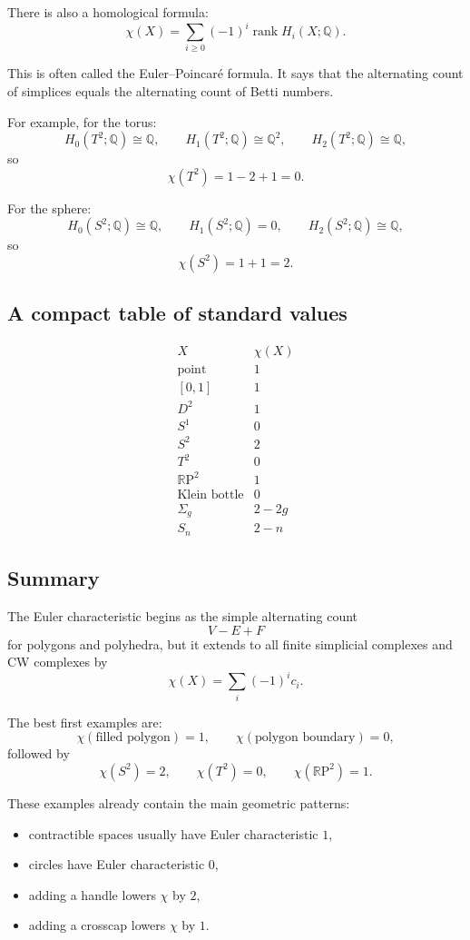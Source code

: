 \documentclass[12pt,a4paper]{article}
\DeclareMathOperator{\rank}{rank}
\newcommand{\Q}{\mathbb{Q}}
\newcommand{\RP}{\mathbb{R}\mathrm{P}}
\theoremstyle{notespace}
\begin{document}
There is also a homological formula:
\[
\chi(X)=\sum_{i\ge 0}(-1)^i \rank H_i(X;\Q).
\]

This is often called the Euler--Poincar\'e formula. It says that the alternating count of simplices equals the alternating count of Betti numbers.

For example, for the torus:
\[
H_0(T^2;\Q)\cong \Q,\qquad
H_1(T^2;\Q)\cong \Q^2,\qquad
H_2(T^2;\Q)\cong \Q,
\]
so
\[
\chi(T^2)=1-2+1=0.
\]

For the sphere:
\[
H_0(S^2;\Q)\cong \Q,\qquad
H_1(S^2;\Q)=0,\qquad
H_2(S^2;\Q)\cong \Q,
\]
so
\[
\chi(S^2)=1+1=2.
\]

\subsection{A compact table of standard values}

\[
\begin{array}{c|c}
	X & \chi(X)\\ \hline
	\text{point} & 1\\
	\left[0,1\right] & 1\\
	D^2 & 1\\
	S^1 & 0\\
	S^2 & 2\\
	T^2 & 0\\
	\RP^2 & 1\\
	\text{Klein bottle} & 0\\
	\Sigma_g & 2-2g\\
	S_n & 2-n
\end{array}
\]

\subsection{Summary}

The Euler characteristic begins as the simple alternating count
\[
V-E+F
\]
for polygons and polyhedra, but it extends to all finite simplicial complexes and CW complexes by
\[
\chi(X)=\sum_i (-1)^i c_i.
\]

The best first examples are:
\[
\chi(\text{filled polygon})=1,
\qquad
\chi(\text{polygon boundary})=0,
\]
followed by
\[
\chi(S^2)=2,\qquad \chi(T^2)=0,\qquad \chi(\RP^2)=1.
\]

These examples already contain the main geometric patterns:
\begin{itemize}
	\item contractible spaces usually have Euler characteristic \(1\),
	\item circles have Euler characteristic \(0\),
	\item adding a handle lowers \(\chi\) by \(2\),
	\item adding a crosscap lowers \(\chi\) by \(1\).
\end{itemize}
\end{document}
